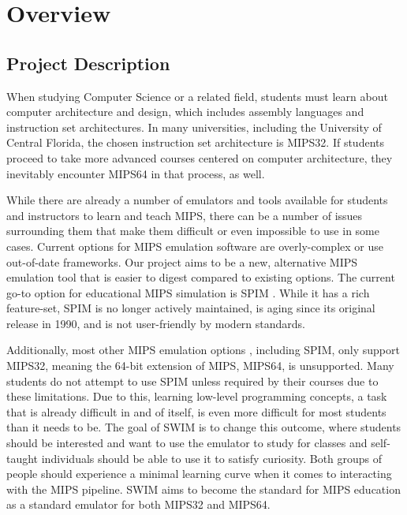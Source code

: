 \documentclass[
    paper=letter,
    parskip=half,
    fontsize=12pt,
    titlepage=firstiscover,
    toc=bibliography,
    numbers=endperiod
]{scrartcl}
\let\oldsection\section
\renewcommand{\section}{\newpage\oldsection}
\begin{document}
\section{Overview}

\subsection{Project Description}
\label{subsec:project-description}

When studying Computer Science or a related field, students must learn about computer architecture and design, which includes assembly languages and instruction set architectures. In many universities, including the University of Central Florida, the chosen instruction set architecture is MIPS32. If students proceed to take more advanced courses centered on computer architecture, they inevitably encounter MIPS64 in that process, as well.

While there are already a number of emulators and tools available for students and instructors to learn and teach MIPS, there can be a number of issues surrounding them that make them difficult or even impossible to use in some cases. Current options for MIPS emulation software are overly-complex or use out-of-date frameworks. Our project aims to be a new, alternative MIPS emulation tool that is easier to digest compared to existing options. The current go-to option for educational MIPS simulation is SPIM \cite{spim}. While it has a rich feature-set, SPIM is no longer actively maintained, is aging since its original release in 1990, and is not user-friendly by modern standards.

Additionally, most other MIPS emulation options \cite{wepsim, jsspim, wemips, mips-interpreter, mini-mips, mips-assembler-field-guide, mips-assembler-hogan, cpulator}, including SPIM, only support MIPS32, meaning the 64-bit extension of MIPS, MIPS64, is unsupported. Many students do not attempt to use SPIM unless required by their courses due to these limitations. Due to this, learning low-level programming concepts, a task that is already difficult in and of itself, is even more difficult for most students than it needs to be. The goal of SWIM is to change this outcome, where students should be interested and want to use the emulator to study for classes and self-taught individuals should be able to use it to satisfy curiosity. Both groups of people should experience a minimal learning curve when it comes to interacting with the MIPS pipeline. SWIM aims to become the standard for MIPS education as a standard emulator for both MIPS32 and MIPS64.
\end{document}
